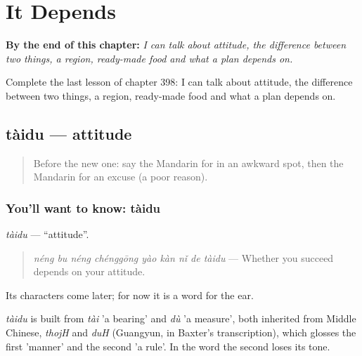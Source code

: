 
\chapter{It Depends}
\label{ch:zh-it-depends}

\begin{chapteropening}
\textbf{By the end of this chapter:} \emph{I can talk about attitude, the difference between two things, a region, ready-made food and what a plan depends on.}

Complete the last lesson of chapter 398: I can talk about attitude, the difference between two things, a region, ready-made food and what a plan depends on.
\end{chapteropening}

\section[tàidu]{tàidu — attitude}

\label{lesson:ZH-C398-taidu}



\begin{quote}
Before the new one: say the Mandarin for in an awkward spot, then the Mandarin for an excuse (a poor reason).
\end{quote}

\subsection*{You'll want to know: tàidu}
\emph{tàidu} — \textquotedblleft{}attitude\textquotedblright{}.

\begin{quote}
\emph{néng bu néng chénggōng yào kàn nǐ de tàidu} — Whether you succeed depends on your attitude.
\end{quote}

Its characters come later; for now it is a word for the ear.

\begin{cousinweb}
\emph{tàidu} is built from \emph{tài} 'a bearing' and \emph{dù} 'a measure', both inherited from Middle Chinese, \emph{thojH} and \emph{duH} (Guangyun, in Baxter's transcription), which glosses the first 'manner' and the second 'a rule'. In the word the second loses its tone.
\end{cousinweb}

